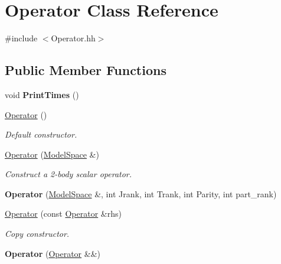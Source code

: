 \hypertarget{classOperator}{\section{Operator Class Reference}
\label{classOperator}
}


{\ttfamily \#include $<$Operator.\-hh$>$}

\subsection*{Public Member Functions}
\begin{DoxyCompactItemize}
\item 
\hypertarget{classOperator_aa8280e8e2c6be73a9594789127b939c1}{void {\bfseries Print\-Times} ()}\label{classOperator_aa8280e8e2c6be73a9594789127b939c1}

\item 
\hypertarget{classOperator_acf2514c5e9f48b0a988c955a7d41c486}{\hyperlink{classOperator_acf2514c5e9f48b0a988c955a7d41c486}{Operator} ()}\label{classOperator_acf2514c5e9f48b0a988c955a7d41c486}

\begin{DoxyCompactList}\small\item\em Default constructor. \end{DoxyCompactList}\item 
\hypertarget{classOperator_ae59dd1e9ea828f88637f001e987195b6}{\hyperlink{classOperator_ae59dd1e9ea828f88637f001e987195b6}{Operator} (\hyperlink{classModelSpace}{Model\-Space} \&)}\label{classOperator_ae59dd1e9ea828f88637f001e987195b6}

\begin{DoxyCompactList}\small\item\em Construct a 2-\/body scalar operator. \end{DoxyCompactList}\item 
\hypertarget{classOperator_ab120301ff79330ae6593fd13445f24f1}{{\bfseries Operator} (\hyperlink{classModelSpace}{Model\-Space} \&, int Jrank, int Trank, int Parity, int part\-\_\-rank)}\label{classOperator_ab120301ff79330ae6593fd13445f24f1}

\item 
\hypertarget{classOperator_ae229a22ab49ca258f69c1c2c267b2aeb}{\hyperlink{classOperator_ae229a22ab49ca258f69c1c2c267b2aeb}{Operator} (const \hyperlink{classOperator}{Operator} \&rhs)}\label{classOperator_ae229a22ab49ca258f69c1c2c267b2aeb}

\begin{DoxyCompactList}\small\item\em Copy constructor. \end{DoxyCompactList}\item 
\hypertarget{classOperator_a293af74eada6fea4cd110b15d4fe1090}{{\bfseries Operator} (\hyperlink{classOperator}{Operator} \&\&)}\label{classOperator_a293af74eada6fea4cd110b15d4fe1090}


\end{DoxyCompactItemize}
